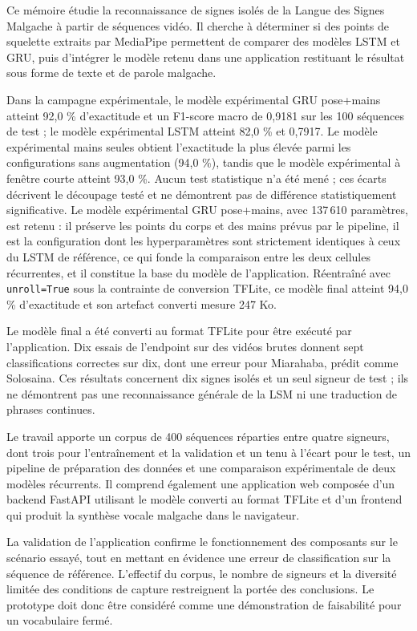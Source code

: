 \begin{conclusion}

Ce mémoire étudie la reconnaissance de signes isolés de la Langue des Signes Malgache à partir de séquences vidéo. Il cherche à déterminer si des points de squelette extraits par MediaPipe permettent de comparer des modèles LSTM et GRU, puis d'intégrer le modèle retenu dans une application restituant le résultat sous forme de texte et de parole malgache.

Dans la campagne expérimentale, le modèle expérimental GRU pose+mains atteint 92,0 \% d'exactitude et un F1-score macro de 0,9181 sur les 100 séquences de test ; le modèle expérimental LSTM atteint 82,0 \% et 0,7917. Le modèle expérimental mains seules obtient l'exactitude la plus élevée parmi les configurations sans augmentation (94,0 \%), tandis que le modèle expérimental à fenêtre courte atteint 93,0 \%. Aucun test statistique n'a été mené ; ces écarts décrivent le découpage testé et ne démontrent pas de différence statistiquement significative. Le modèle expérimental GRU pose+mains, avec 137\,610 paramètres, est retenu : il préserve les points du corps et des mains prévus par le pipeline, il est la configuration dont les hyperparamètres sont strictement identiques à ceux du LSTM de référence, ce qui fonde la comparaison entre les deux cellules récurrentes, et il constitue la base du modèle de l'application. Réentraîné avec \texttt{unroll=True} sous la contrainte de conversion TFLite, ce modèle final atteint 94,0 \% d'exactitude et son artefact converti mesure 247 Ko.

Le modèle final a été converti au format TFLite pour être exécuté par l'application. Dix essais de l'endpoint sur des vidéos brutes donnent sept classifications correctes sur dix, dont une erreur pour Miarahaba, prédit comme Solosaina. Ces résultats concernent dix signes isolés et un seul signeur de test ; ils ne démontrent pas une reconnaissance générale de la LSM ni une traduction de phrases continues.

Le travail apporte un corpus de 400 séquences réparties entre quatre signeurs, dont trois pour l'entraînement et la validation et un tenu à l'écart pour le test, un pipeline de préparation des données et une comparaison expérimentale de deux modèles récurrents. Il comprend également une application web composée d'un backend FastAPI utilisant le modèle converti au format TFLite et d'un frontend qui produit la synthèse vocale malgache dans le navigateur.

La validation de l'application confirme le fonctionnement des composants sur le scénario essayé, tout en mettant en évidence une erreur de classification sur la séquence de référence. L'effectif du corpus, le nombre de signeurs et la diversité limitée des conditions de capture restreignent la portée des conclusions. Le prototype doit donc être considéré comme une démonstration de faisabilité pour un vocabulaire fermé.


\end{conclusion}
